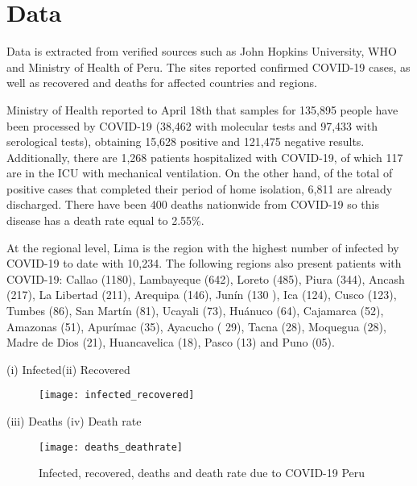 \documentclass[12pt]{article}
\begin{document}
\clearpage

\section{Data}

Data is extracted from verified sources such as John Hopkins University, WHO and Ministry of Health of Peru. The sites reported confirmed COVID-19 cases, as well as recovered and deaths for affected countries and regions. 

Ministry of Health reported to April 18th that samples for 135,895 people have been processed by COVID-19 (38,462 with molecular tests and 97,433 with serological tests), obtaining 15,628 positive and 121,475 negative results. Additionally, there are 1,268 patients hospitalized with COVID-19, of which 117 are in the ICU with mechanical ventilation. On the other hand, of the total of positive cases that completed their period of home isolation, 6,811 are already discharged. There have been 400 deaths nationwide  from COVID-19 so this disease has a death rate equal to 2.55\%.

At the regional level, Lima is the region with the highest number of infected by COVID-19 to date with 10,234. The following regions also present patients with COVID-19: Callao (1180), Lambayeque (642), Loreto (485), Piura (344), Ancash (217), La Libertad (211), Arequipa (146), Junín (130 ), Ica (124), Cusco (123), Tumbes (86), San Martín (81), Ucayali (73), Huánuco (64), Cajamarca (52), Amazonas (51), Apurímac (35), Ayacucho ( 29), Tacna (28), Moquegua (28), Madre de Dios (21), Huancavelica (18), Pasco (13) and Puno (05).

\clearpage
\begin{flushleft}\centering (i) Infected\text{ }\text{ }\text{ }\text{ }\text{ }\text{ }\text{ }\text{ }\text{ }\text{ }\text{ }\text{ }\text{ }\text{ }\text{ }\text{ }\text{ }\text{ }\text{ }\text{ }\text{ }\text{ }\text{ }\text{ }\text{ }\text{ }\text{ }\text{ }\text{ }\text{ }\text{ }\text{ }\text{ }\text{ }\text{ }\text{ }\text{ }(ii) Recovered  \end{flushleft}\begin{figure}[h]
\centering
\texttt{[image: infected\_recovered]}
\end{figure}\begin{flushleft}\centering (iii) Deaths \text{ }\text{ }\text{ }\text{ }\text{ }\text{ }\text{ }\text{ }\text{ }\text{ }\text{ }\text{ }\text{ }\text{ }\text{ }\text{ }\text{ }\text{ }\text{ }\text{ }\text{ }\text{ }\text{ }\text{ }\text{ }\text{ }\text{ }\text{ }\text{ }\text{ }\text{ }\text{ }\text{ }\text{ }\text{ }\text{ }\text{ }(iv) Death rate  \end{flushleft}\begin{figure}[h]
\centering
\texttt{[image: deaths\_deathrate]}
\caption{Infected, recovered, deaths and death rate due to COVID-19 Peru}
\end{figure}
\clearpage
\end{document}

